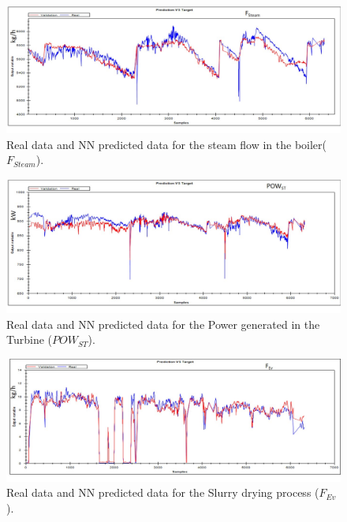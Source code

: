 \begin{figure}
\centering
\includegraphics[width=1\textwidth]{ANN-EXHAUSTRECOVERY.pdf}
\caption{Real data and NN predicted data for the steam flow in the boiler($F_{Steam}$).}
\label{Fboiler}
\end{figure}

\begin{figure}
\centering
\includegraphics[width=1\textwidth]{ANN-ST.pdf}
\caption{Real data and NN predicted data for the Power generated in the Turbine ($POW_{ST}$).}
\label{Pturbine}
\end{figure}

\begin{figure}
\centering
\includegraphics[width=1\textwidth]{ANN-Evaporator.pdf}
\caption{Real data and NN predicted data for the Slurry drying process ($F_{Ev}$).}
\label{PEvaporator}
\end{figure}

